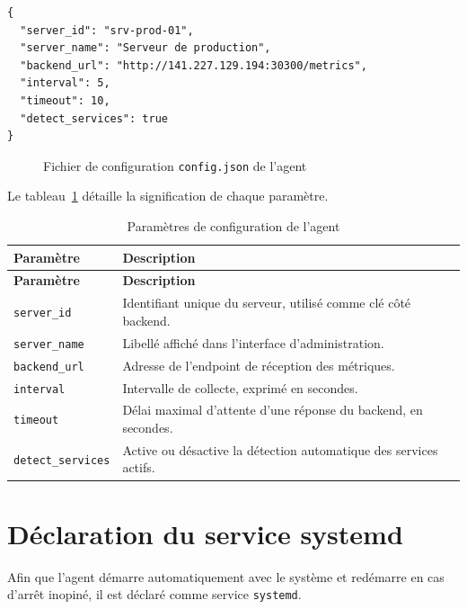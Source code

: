 \begin{lrbox}{\annexbox}
\begin{minipage}{0.88\textwidth}
\begin{verbatim}
{
  "server_id": "srv-prod-01",
  "server_name": "Serveur de production",
  "backend_url": "http://141.227.129.194:30300/metrics",
  "interval": 5,
  "timeout": 10,
  "detect_services": true
}
\end{verbatim}
\end{minipage}
\end{lrbox}
\begin{figure}[H]
\centering
\fbox{\usebox{\annexbox}}
\caption{Fichier de configuration \texttt{config.json} de l'agent}
\label{fig:annexe-config}
\end{figure}

Le tableau~\ref{tab:annexe-config} détaille la signification de chaque paramètre.

\renewcommand{\arraystretch}{1.3}
\begin{longtable}{|>{\raggedright\arraybackslash}p{3.6cm}
                  |>{\raggedright\arraybackslash}p{10.2cm}|}
\hline
\textbf{Paramètre} & \textbf{Description} \\
\hline
\endfirsthead

\hline
\textbf{Paramètre} & \textbf{Description} \\
\hline
\endhead

\hline
\caption{Paramètres de configuration de l'agent}
\label{tab:annexe-config}
\endlastfoot

\texttt{server\_id} & Identifiant unique du serveur, utilisé comme clé côté backend. \\
\hline
\texttt{server\_name} & Libellé affiché dans l'interface d'administration. \\
\hline
\texttt{backend\_url} & Adresse de l'endpoint de réception des métriques. \\
\hline
\texttt{interval} & Intervalle de collecte, exprimé en secondes. \\
\hline
\texttt{timeout} & Délai maximal d'attente d'une réponse du backend, en secondes. \\
\hline
\texttt{detect\_services} & Active ou désactive la détection automatique des services actifs. \\
\hline

\end{longtable}

\section{Déclaration du service systemd}
Afin que l'agent démarre automatiquement avec le système et redémarre en cas d'arrêt
inopiné, il est déclaré comme service \texttt{systemd}.

